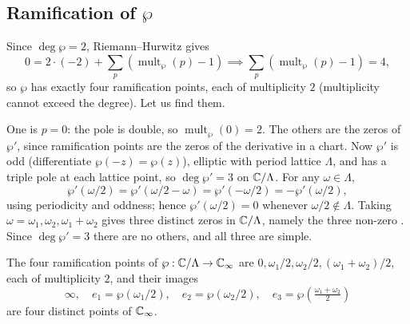 \documentclass[a4paper]{scrartcl}
\newcommand{\Cinf}{\C_\infty}
\newcommand{\mult}{\operatorname{mult}}
\begin{document}
\subsection{Ramification of $\wp$}

Since $\deg\wp = 2$, Riemann--Hurwitz gives
$$
0 = 2\cdot(-2) + \sum_p(\mult_\wp(p)-1) \implies \sum_p(\mult_\wp(p)-1) = 4,
$$
so $\wp$ has exactly four ramification points, each of multiplicity $2$ (multiplicity
cannot exceed the degree). Let us find them.

One is $p = 0$: the pole is double, so $\mult_\wp(0)=2$. The others are the zeros of
$\wp'$, since ramification points are the zeros of the derivative in a chart. Now $\wp'$
is odd (differentiate $\wp(-z)=\wp(z)$),
elliptic with period lattice $\Lambda$, and has a triple pole at each lattice point, so
$\deg\wp' = 3$ on $\mathbb{C}/\Lambda$. For any $\omega\in\Lambda$,
$$
\wp'(\omega/2) = \wp'(\omega/2 - \omega) = \wp'(-\omega/2) = -\wp'(\omega/2),
$$
using periodicity and oddness; hence $\wp'(\omega/2) = 0$ whenever $\omega/2\notin\Lambda$.
Taking $\omega = \omega_1, \omega_2, \omega_1+\omega_2$ gives three distinct zeros in
$\mathbb{C}/\Lambda$, namely the three non-zero . Since $\deg \wp'=3$ there are
no others, and all three are simple.

\begin{center}
\end{center}

\begin{proposition}\label{prop:wpbranch}
	The four ramification points of $\wp : \C/\Lambda \to \Cinf$ are
	$0, \omega_1/2, \omega_2/2, (\omega_1+\omega_2)/2$, each of multiplicity $2$, and their
	images
	$$
	\infty, \quad e_1 = \wp(\omega_1/2), \quad e_2 = \wp(\omega_2/2), \quad e_3 = \wp\!\left(\tfrac{\omega_1+\omega_2}{2}\right)
	$$
	are four distinct points of $\Cinf$.
\end{proposition}
\end{document}
